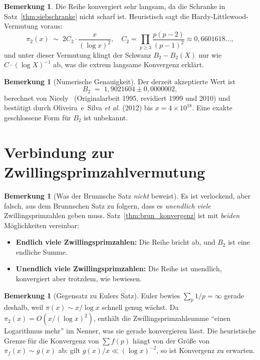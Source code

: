 \documentclass[12pt,a4paper]{amsart}
\theoremstyle{definition}
\newtheorem{bemerkung}[theorem]{Bemerkung}
\begin{document}
\begin{bemerkung}
  Die Reihe konvergiert sehr langsam, da die Schranke in
  Satz~\ref{thm:siebschranke} nicht scharf ist.  Heuristisch sagt
  die Hardy-Littlewood-Vermutung voraus:
  \[
    \pi_2(x) \;\sim\; 2C_2 \cdot \frac{x}{(\log x)^2},
    \quad
    C_2 = \prod_{p \geq 3} \frac{p(p-2)}{(p-1)^2} \approx 0{,}6601618\ldots,
  \]
  und unter dieser Vermutung klingt der Schwanz $B_2 - B_2(X)$ nur wie
  $C \cdot (\log X)^{-1}$ ab, was die extrem langsame Konvergenz erklärt.
\end{bemerkung}

\begin{bemerkung}[Numerische Genauigkeit]
  Der derzeit akzeptierte Wert ist
  \[
    B_2 \;=\; 1{,}9021604 \pm 0{,}0000002,
  \]
  berechnet von Nicely~\cite{Nicely1995} (Originalarbeit 1995, revidiert 1999 und 2010)
  und bestätigt durch Oliveira~e~Silva \emph{et al.} (2012) bis $x = 4 \times 10^{18}$.
  Eine exakte geschlossene Form für $B_2$ ist unbekannt.
\end{bemerkung}

\section{Verbindung zur Zwillingsprimzahlvermutung}
\label{sec:vermutung}

\begin{bemerkung}[Was der Brunnsche Satz \emph{nicht} beweist]
  Es ist verlockend, aber falsch, aus dem Brunnschen Satz zu folgern, dass
  es \emph{unendlich viele} Zwillingsprimzahlen geben muss.
  Satz~\ref{thm:brun_konvergenz} ist mit \emph{beiden} Möglichkeiten vereinbar:
  \begin{itemize}
    \item \textbf{Endlich viele Zwillingsprimzahlen:} Die Reihe bricht ab,
      und $B_2$ ist eine endliche Summe.
    \item \textbf{Unendlich viele Zwillingsprimzahlen:} Die Reihe ist
      unendlich, konvergiert aber trotzdem, wie bewiesen.
  \end{itemize}
\end{bemerkung}

\begin{bemerkung}[Gegensatz zu Eulers Satz]
  Euler bewies $\sum_p 1/p = \infty$ gerade deshalb, weil $\pi(x) \sim x/\log x$
  schnell genug wächst.  Da $\pi_2(x) = O(x/(\log x)^2)$, enthält die
  Zwillingsprimzahlsumme ``einen Logarithmus mehr'' im Nenner, was sie gerade
  konvergieren lässt.  Die heuristische Grenze für die Konvergenz von $\sum f(p)$
  hängt von der Größe von $\pi_f(x) \sim g(x)$ ab: gilt
  $g(x)/x \ll (\log x)^{-2}$, so ist Konvergenz zu erwarten.
\end{bemerkung}
\end{document}
